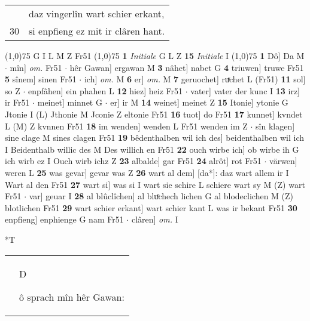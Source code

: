 \documentclass[8pt,a4paper,notitlepage]{article}
\begin{document}
\begin{table}[ht]
\begin{minipage}[t]{0.5\linewidth}
\begin{tabular}{rl}
 & daz vingerlîn wart schier erkant,\\ 
30 & si enpfieng ez mit ir clâren hant.\\ 
\end{tabular}
\scriptsize
\line(1,0){75} \newline
G I L M Z Fr51 \newline
\line(1,0){75} \newline
\textbf{1} \textit{Initiale} G L Z  \textbf{15} \textit{Initiale} I  \newline
\line(1,0){75} \newline
\textbf{1} Dô] Da M  $\cdot$ mîn] \textit{om.} Fr51  $\cdot$ hêr Gawan] ergawan M \textbf{3} nâhet] nabet G \textbf{4} triuwen] truwe Fr51 \textbf{5} sînem] sinen Fr51  $\cdot$ ich] \textit{om.} M \textbf{6} er] \textit{om.} M \textbf{7} geruochet] ruͯchet L (Fr51) \textbf{11} sol] so Z  $\cdot$ enpfâhen] ein phahen L \textbf{12} hiez] heiz Fr51  $\cdot$ vater] vater der kunc I \textbf{13} irz] ir Fr51  $\cdot$ meinet] minnet G  $\cdot$ er] ir M \textbf{14} weinet] meinet Z \textbf{15} Itonie] ytonie G Jtonie I (L) Jthonie M Jconie Z eltonie Fr51 \textbf{16} tuot] do Fr51 \textbf{17} kunnet] kvndet L (M) Z kvnnen Fr51 \textbf{18} im wenden] wenden L Fr51 wenden im Z  $\cdot$ sîn klagen] sine clage M sines clagen Fr51 \textbf{19} bêdenthalben wil ich des] beidenthalben wil ich I Beidenthalb willic des M Des willich en Fr51 \textbf{22} ouch wirbe ich] ob wirbe ih G ich wirb ez I Ouch wirb ichz Z \textbf{23} albalde] gar Fr51 \textbf{24} alrôt] rot Fr51  $\cdot$ värwen] weren L \textbf{25} was gevar] gevar was Z \textbf{26} wart al dem] [da*]: daz wart allem ir I Wart al den Fr51 \textbf{27} wart si] was si I wart sie schire L schiere wart sy M (Z) wart Fr51  $\cdot$ var] geuar I \textbf{28} al blûclîchen] al bluͦchech lichen G al blodeclichen M (Z) blotlichen Fr51 \textbf{29} wart schier erkant] wart schier kant L was ir bekant Fr51 \textbf{30} enpfieng] enphienge G nam Fr51  $\cdot$ clâren] \textit{om.} I \newline
\end{minipage}
\hspace{0.5cm}
\begin{minipage}[t]{0.5\linewidth}
\small
\begin{center}*T
\end{center}
\begin{tabular}{rl}
 & \begin{large}D\end{large}ô sprach mîn hêr Gawan:\\ 

\end{tabular}
\end{minipage}
\end{table}
\end{document}
